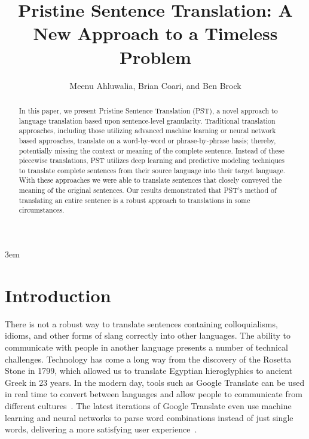 \documentclass[runningheads]{llncs}
\title{Pristine Sentence Translation: A New Approach to a Timeless Problem}
\author{
	Meenu Ahluwalia, Brian Coari, and Ben Brock
}
\institute{Master of Science in Data Science \\ Southern Methodist University \\ Dallas, Texas USA \\
	\email{\{mahluwalia, bcoari, bbrock\}@smu.edu}}
\begin{document}
	\emergencystretch 3em
	\maketitle
	
	\begin{abstract}

In this paper, we present Pristine Sentence Translation (PST), a novel approach to language translation based upon sentence-level granularity. Traditional translation approaches, including those utilizing advanced machine learning or neural network based approaches, translate on a word-by-word or phrase-by-phrase basis; thereby, potentially missing the context or meaning of the complete sentence. Instead of these piecewise translations, PST utilizes deep learning and predictive modeling techniques to translate complete sentences from their source language into their target language. With these approaches we were able to translate sentences that closely conveyed the meaning of the original sentences. Our results demonstrated that PST's method of translating an entire sentence is a robust approach to translations in some circumstances.
		
	\end{abstract}
	
	
	\section{Introduction}
	
	There is not a robust way to translate sentences containing colloquialisms, idioms, and other forms of slang correctly into other languages. The ability to communicate with people in another language presents a number of technical challenges. Technology has come a long way from the discovery of the Rosetta Stone in 1799, which allowed us to translate Egyptian hieroglyphics to ancient Greek in 23 years. In the modern day, tools such as Google Translate can be used in real time to convert between languages and allow people to communicate from different cultures~\cite{ref_url6}. The latest iterations of Google Translate even use machine learning and neural networks to parse word combinations instead of just single words, delivering a more satisfying user experience~\cite{ref_url7}.
	
\end{document}
